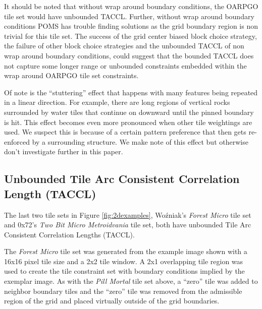 It should be noted that without wrap around boundary conditions, the OARPGO tile set would have unbounded TACCL.
Further, without wrap around boundary conditions POMS has trouble finding solutions as the
grid boundary region is non trivial for this tile set.
The success of the grid center biased block choice strategy, the failure of other block choice strategies and the unbounded TACCL of
non wrap around boundary conditions, could suggest that the bounded TACCL does not capture some longer range or unbounded constraints
  embedded within the wrap around OARPGO tile set constraints.

Of note is the ``stuttering'' effect that happens with many features being repeated in a linear direction.
For example, there are long regions of vertical rocks surrounded by water tiles that continue on downward until the
pinned boundary is hit.
This effect becomes even more pronounced when other tile weightings are used.
We suspect this is because of a certain pattern preference that then gets re-enforced
by a surrounding structure.
We make note of this effect but otherwise don't investigate further in this paper.

\subsection{Unbounded Tile Arc Consistent Correlation Length (TACCL)}

The last two tile sets in Figure \ref{fig:2dexamples}, Wo\'zniak's \textit{Forest Micro} tile set and 0x72's \textit{Two Bit Micro Metroidvania} tile set,
both have unbounded Tile Arc Consistent Correlation Lengths (TACCL).

The \textit{Forest Micro} tile set was generated from the example image shown with a 16x16 pixel tile size and a 2x2 tile window.
A 2x1 overlapping tile region was used to create the tile constraint set with boundary conditions implied by the exemplar image.
As with the \textit{Pill Mortal} tile set above, a ``zero'' tile was added to neighbor boundary tiles and the ``zero'' tile was removed from
the admissible region of the grid and placed virtually outside of the grid boundaries.

